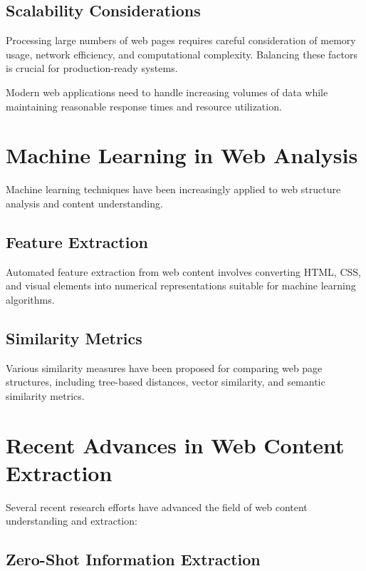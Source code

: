 \subsection{Scalability Considerations}

Processing large numbers of web pages requires careful consideration of memory usage, network efficiency, and computational complexity. Balancing these factors is crucial for production-ready systems.

Modern web applications need to handle increasing volumes of data while maintaining reasonable response times and resource utilization.

\section{Machine Learning in Web Analysis}
\label{sec:ml_web_analysis}

Machine learning techniques have been increasingly applied to web structure analysis and content understanding.

\subsection{Feature Extraction}

Automated feature extraction from web content involves converting HTML, CSS, and visual elements into numerical representations suitable for machine learning algorithms.

\subsection{Similarity Metrics}

Various similarity measures have been proposed for comparing web page structures, including tree-based distances, vector similarity, and semantic similarity metrics.

\section{Recent Advances in Web Content Extraction}
\label{sec:recent_advances}

Several recent research efforts have advanced the field of web content understanding and extraction:

\subsection{Zero-Shot Information Extraction}

